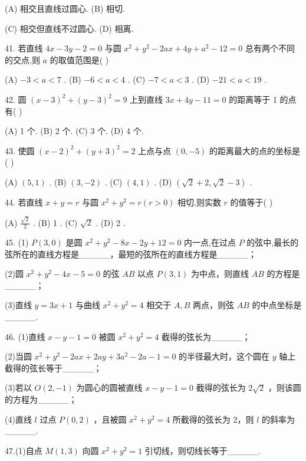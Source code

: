 \documentclass[10pt]{article}
\begin{document}
(A) 相交且直线过圆心. (B) 相切.

(C) 相交但直线不过圆心. (D) 相离.

41. 若直线 \({4x} - {3y} - 2 = 0\) 与圆 \({x}^{2} + {y}^{2} - {2ax} + {4y} + {a}^{2} - {12} = 0\) 总有两个不同的交点,则 \(a\) 的取值范围是( )

(A) \(- 3 < a < 7\) . (B) \(- 6 < a < 4\) . (C) \(- 7 < a < 3\) . (D) \(- {21} < a < {19}\) .

42. 圆 \({\left( x - 3\right) }^{2} + {\left( y - 3\right) }^{2} = 9\) 上到直线 \({3x} + {4y} - {11} = 0\) 的距离等于 1 的点有( )

(A) 1 个. (B) 2 个. (C) 3 个. (D) 4 个.

43. 使圆 \({\left( x - 2\right) }^{2} + {\left( y + 3\right) }^{2} = 2\) 上点与点 \(\left( {0, - 5}\right)\) 的距离最大的点的坐标是 ( )

(A) \(\left( {5,1}\right)\) . (B) \(\left( {3, - 2}\right)\) . (C) \(\left( {4,1}\right)\) . (D) \(\left( {\sqrt{2} + 2,\sqrt{2} - 3}\right)\) .

44. 若直线 \(x + y = r\) 与圆 \({x}^{2} + {y}^{2} = r\left( {r > 0}\right)\) 相切,则实数 \(r\) 的值等于( )

(A) \(\frac{\sqrt{2}}{2}\) . (B) 1 . (C) \(\sqrt{2}\) . (D) 2 .

45. (1) \(P\left( {3,0}\right)\) 是圆 \({x}^{2} + {y}^{2} - {8x} - {2y} + {12} = 0\) 内一点,在过点 \(P\) 的弦中,最长的弦所在的直线方程是\_\_\_\_\_，最短的弦所在的直线方程是\_\_\_\_\_；

(2)圆 \({x}^{2} + {y}^{2} - {4x} - 5 = 0\) 的弦 \({AB}\) 以点 \(P\left( {3,1}\right)\) 为中点，则直线 \({AB}\) 的方程是\_\_\_\_\_；

(3)直线 \(y = {{3x} + 1}\) 与曲线 \({x}^{2} + {y}^{2} = 4\) 相交于 \(A,B\) 两点，则弦 \({AB}\) 的中点坐标是\_\_\_\_\_.

46. (1)直线 \(x - y - 1 = 0\) 被圆 \({x}^{2} + {y}^{2} = 4\) 截得的弦长为\_\_\_\_\_；

(2)当圆 \({x}^{2} + {y}^{2} - {2ax} + {2ay} + 3{a}^{2} - {2a} - 1 = 0\) 的半径最大时，这个圆在 \(y\) 轴上截得的弦长等于\_\_\_\_\_；

(3)若以 \(O\left( {2, - 1}\right)\) 为圆心的圆被直线 \(x - y - 1 = 0\) 截得的弦长为 \(2\sqrt{2}\) ，则该圆的方程为\_\_\_\_\_；

(4)直线 \(l\) 过点 \(P\left( {0,2}\right)\) ，且被圆 \({x}^{2} + {y}^{2} = 4\) 所截得的弦长为 2，则 \(l\) 的斜率为\_\_\_\_\_.

47.(1)自点 \(M\left( {1,3}\right)\) 向圆 \({x}^{2} + {y}^{2} = 1\) 引切线，则切线长等于\_\_\_\_\_.
\end{document}
